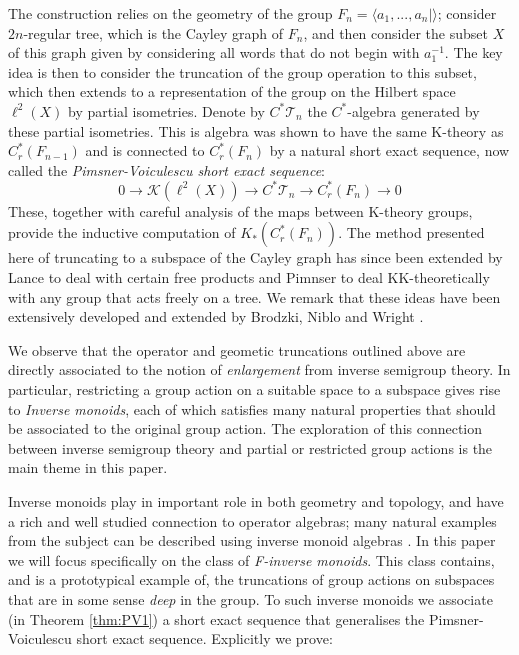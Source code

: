 \documentclass[11pt]{amsart}
\theoremstyle{plain}
\theoremstyle{definition}%
\theoremstyle{remark}%
\begin{document}
The construction relies on the geometry of the group $F_{n}=\langle a_{1},...,a_{n} | \rangle$; consider $2n$-regular tree, which is the Cayley graph of $F_{n}$, and then consider the subset $X$ of this graph given by considering all words that do not begin with $a_{1}^{-1}$. The key idea is then to consider the truncation of the group operation to this subset, which then extends to a representation of the group on the Hilbert space $\ell^{2}(X)$ by partial isometries. Denote by $C^{*}\mathcal{T}_{n}$ the $C^{*}$-algebra generated by these partial isometries. This is algebra was shown to have the same K-theory as $C^{*}_{r}(F_{n-1})$ and is connected to $C^{*}_{r}(F_{n})$ by a natural short exact sequence, now called the \textit{Pimsner-Voiculescu short exact sequence}:
\begin{equation*}
0 \rightarrow \mathcal{K}(\ell^{2}(X)) \rightarrow C^{*}\mathcal{T}_{n} \rightarrow C^{*}_{r}(F_{n}) \rightarrow 0
\end{equation*}
These, together with careful analysis of the maps between K-theory groups, provide the inductive computation of $K_{*}(C^{*}_{r}(F_{n}))$. The method presented here of truncating to a subspace of the Cayley graph has since been extended by Lance \cite{MR723010} to deal with certain free products and Pimnser \cite{MR860685} to deal KK-theoretically with any group that acts freely on a tree. We remark that these ideas have been extensively developed and extended by Brodzki, Niblo and Wright \cite{BNW-KTA}.

We observe that the operator and geometic truncations outlined above are directly associated to the notion of \textit{enlargement} \cite{MR2221438} from inverse semigroup theory. In particular, restricting a group action on a suitable space to a subspace gives rise to \textit{Inverse monoids}, each of which satisfies many natural properties that should be associated to the original group action. The exploration of this connection between inverse semigroup theory and partial or restricted group actions is the main theme in this paper.

Inverse monoids play in important role in both geometry and topology, and have a rich and well studied connection to operator algebras; many natural examples from the subject can be described using inverse monoid algebras \cite{MR1798993,EGS-2011,mypub1}. In this paper we will focus specifically on the class of \textit{F-inverse monoids}. This class contains, and is a prototypical example of, the truncations of group actions on subspaces that are in some sense \textit{deep} in the group. To such inverse monoids we associate (in Theorem \ref{thm:PV1}) a short exact sequence that generalises the Pimsner-Voiculescu short exact sequence. Explicitly we prove:
\end{document}
